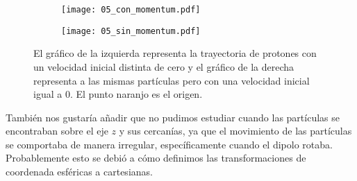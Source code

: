 \documentclass{article}
\begin{document}
\begin{figure}[h]
    \centering
    \begin{subfigure}[b]{0.4\textwidth}
        \centering
        \texttt{[image: 05\_con\_momentum.pdf]}
        \caption{}
        \label{05con}
    \end{subfigure}
    \begin{subfigure}[b]{0.4\textwidth}
        \centering
        \texttt{[image: 05\_sin\_momentum.pdf]}
        \caption{}
        \label{05sin}
    \end{subfigure}
    \caption{El gráfico de la izquierda representa la trayectoria de protones con un velocidad inicial distinta de cero y el gráfico de la derecha representa a las mismas partículas pero con una velocidad inicial igual a 0. El punto naranjo es el origen.}
    \label{}
\end{figure}

También nos gustaría añadir que no pudimos estudiar cuando las partículas se encontraban sobre el eje $z$ y sus cercanías, ya que el movimiento de las partículas se comportaba de manera irregular, específicamente cuando el dipolo rotaba. Probablemente esto se debió a cómo definimos las transformaciones de coordenada esféricas a cartesianas. 




\end{document}
